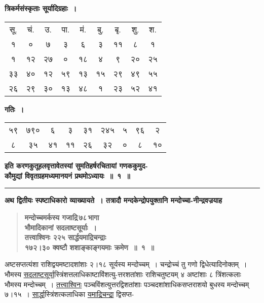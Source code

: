\documentclass[11pt, openany]{book}
\begin{document}
\newpage

\begin{center}
{\large \textbf{त्रिकर्मसंस्कृताः सूर्यादिग्रहाः~। }}
\vspace{4mm}

\begin{tabular}{ccccccccc}
सू. & चं. & उ. & पा. & मं. & बु. & बृ. & शु. & श. \\
१ & ० & ७ & ३ & ६ & ३ & ११ & ८ & १\\
१ & १२ & २७ & ० & १८ & ४ & ९ & २० & २५\\
३३ & ४० & १२ & ५९ & १३ & १५ & २९ & ४९ & ५५\\
२६ & २९ & ३० & १३ & ४८ & १ & २३ & ५२ & ४१
\end{tabular}
\vspace{6mm}

{\large \textbf{गतिः~।}}
\vspace{4mm}

\begin{tabular}{ccccccccc}
५९ & ७९० & ६ & ३ & ३१ & २४५ & ५ & ९६ & २\\
८ & ३५ & ४१ & ११ & २६ & ३२ & ० & ८ & १०
\end{tabular}
\vspace{6mm}

{\large \textbf{इति करणकुतूहलवृत्तावेतस्यां सुमतिहर्षरचितायां गणककुमुद-\\
कौमुद्यां विवृतग्रहमध्यमानयनं प्रथमोऽध्यायः~॥~१~॥}}\\
\vspace{2mm}

\noindent\rule{7cm}{1pt}
\end{center}
\vspace{4mm}

{\small \textbf{अथ द्वितीयः स्पष्टाधिकारो व्याख्यायते~। तत्रादौ मन्दकेन्द्रोपयुक्तानि मन्दोच्चा-नीन्द्रवज्रयाह\textendash }}

 \label{2.1}
\begin{quote}
{\large \textbf{{\color{purple}मन्दोच्चमर्कस्य गजाद्रि\textendash \,७८\textendash \,भागा \\
भौमादिकानां सदलाष्टसूर्याः~। \\
तत्त्वाश्विनः २२५ सार्द्धयमाद्रिचन्द्राः\\
१७२।३० क्वष्टौ शशाङ्काङ्गयमाः क्रमेण~॥~१~॥}}}
\end{quote}

अष्टसप्तत्यंशा राशिद्वयमष्टादशांशाः २।१८ सूर्यस्य मन्दोच्चम्~। चन्द्रोच्चं तु गणो द्विधेत्यादिनोक्तम्~। भौमस्य \hyperref[2.1]{सदलाष्टसूर्या}स्त्रिंशत्तलाधिकाष्टाविंशत्यु-त्तरशतांशाः राशिचतुष्टयम् ४ अष्टांशाः ८ त्रिंशत्कलाः भौमस्य मन्दोच्चम्~। \hyperref[2.1]{तत्त्वाश्विनः} \;पञ्चविंशत्युत्तरद्विशतांशाः \;पञ्चदशांशाधिकसप्तराशयो \;बुधस्य मन्दोच्चम् ७।१५~। \hyperref[2.1]{सार्द्धा}स्त्रिंशत्कलाधिका \hyperref[2.1]{यमाद्रिचन्द्रा} द्विसप्त-
\end{document}
